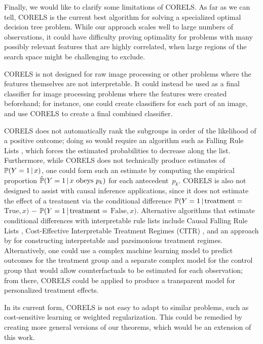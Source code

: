 \begin{arxiv}

Finally, we would like to clarify some limitations of CORELS.
%
As far as we can tell, CORELS is the current best algorithm for solving a
specialized optimal decision tree problem.
%
While our approach scales well to large numbers of observations,
it could have difficulty proving optimality
for problems with many possibly relevant features that are highly correlated,
when large regions of the search space might be challenging to exclude.

CORELS is not designed for raw image processing or other problems where the
features themselves are not interpretable.
%
It could instead be used as a final classifier for image processing problems
where the features were created beforehand; for instance, one could create classifiers
for each part of an image, and use CORELS to create a final combined classifier.

CORELS does not automatically rank the subgroups in order of the likelihood of a
positive outcome; doing so would require an algorithm such as Falling Rule Lists \citep{WangRu15,ChenRu18},
which forces the estimated probabilities to decrease along the list.
%
Furthermore, while CORELS does not technically produce estimates of ${\mathbb{P}(Y=1 \,|\, x)}$,
one could form such an estimate by computing the empirical
proportion ${\hat{\mathbb{P}}(Y=1 \,|\, x \textrm{ obeys } p_k)}$ for each antecedent~$p_k$.
%
CORELS is also not designed to assist with causal inference applications, since
it does not estimate the effect of a treatment via the conditional difference
${\mathbb{P}(Y=1 \,|\, \textrm{treatment} =}$ ${\textrm{True}, x)}$ $-$
${\mathbb{P}(Y=1 \,|\, \textrm{treatment} =}$ ${\textrm{False}, x)}$.
%
Alternative algorithms that estimate conditional differences with interpretable
rule lists include Causal Falling Rule Lists \citep{WangRu15CFRL},
Cost-Effective Interpretable Treatment Regimes (CITR) \citep{LakkarajuRu17},
and an approach by \citet{ZhangEtAl15} for constructing
interpretable and parsimonious treatment regimes. Alternatively, one could use a complex machine learning model to predict outcomes for the treatment group and a separate complex model for the control group that would allow counterfactuals to be estimated for each observation; from there, CORELS could be applied to produce a transparent model for personalized treatment effects.
%

In its current form, CORELS is not easy to adapt to similar problems,
such as cost-sensitive learning or weighted regularization.
%
This could be remedied by creating more general versions of our theorems,
which would be an extension of this work. \citep[Or, one could use the more general but computationally heavy mixed-integer programming algorithm of][which allows easy customization.]{ErtekinRu17}
%


\end{arxiv}
